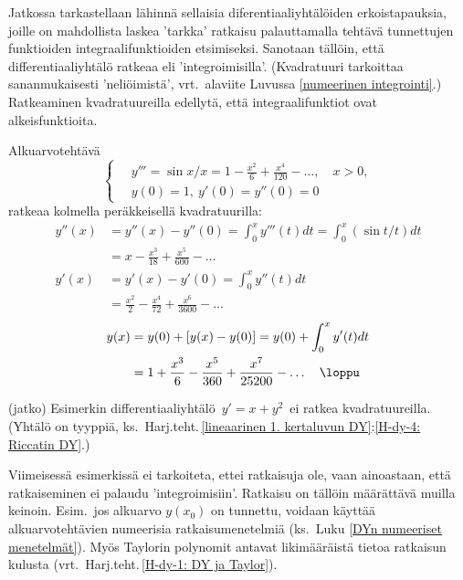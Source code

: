 Jatkossa tarkastellaan lähinnä sellaisia diferentiaaliyhtälöiden erkoistapauksia, joille on
mahdollista laskea 'tarkka' ratkaisu palauttamalla tehtävä tunnettujen funktioiden
integraalifunktioiden etsimiseksi. Sanotaan tällöin, että differentiaaliyhtälö ratkeaa 
%
 eli 'integroimisilla'. (Kvadratuuri tarkoittaa sananmukaisesti
'neliöimistä', vrt.\ alaviite Luvussa \ref{numeerinen integrointi}.) Ratkeaminen kvadratuureilla
 edellytä, että integraalifunktiot ovat alkeisfunktioita.
\begin{Exa}
Alkuarvotehtävä
\[
\left\{ \begin{aligned}
&\,y''' = \sin x/x=1-\frac{x^2}{6}+\frac{x^4}{120}-\ldots,\quad x>0, \\
&\,y(0) =1,\ y'(0)=y''(0)=0
\end{aligned} \right.
\]
ratkeaa kolmella peräkkeisellä kvadratuurilla:
\begin{align*}
y''(x) &= y''(x)-y''(0) =\int_0^x y'''(t)dt =\int_0^x (\sin t / t)dt \\
       &= x-\frac{x^3}{18}+\frac{x^5}{600}-\ldots \\[1mm]
y'(x)  &= y'(x)-y'(0)=\int_0^x y''(t)dt \\
       &= \frac{x^2}{2}-\frac{x^4}{72}+\frac{x^6}{3600}-\ldots
\end{align*}
\begin{align*}
y(x)   &= y(0)+[y(x)-y(0)] = y(0) + \int_0^x y'(t)dt \\
       &= 1+\frac{x^3}{6}-\frac{x^5}{360}+\frac{x^7}{25200}-\ldots \quad\loppu
\end{align*}
\end{Exa}
\jatko\jatko \begin{Exa} (jatko) Esimerkin differentiaaliyhtälö $\,y'=x+y^2\,$ ei ratkea
kvadratuureilla.
(Yhtälö on  tyyppiä,
ks.\ Harj.teht.\,\ref{lineaarinen 1. kertaluvun DY}:\ref{H-dy-4: Riccatin DY}.) \loppu
\end{Exa}
Viimeisessä esimerkissä ei tarkoiteta, ettei ratkaisuja ole, vaan ainoastaan, että
ratkaiseminen ei palaudu 'integroimisiin'. Ratkaisu on tällöin määrättävä muilla keinoin.
Esim.\ jos alkuarvo $y(x_0)$ on tunnettu, voidaan käyttää alkuarvotehtävien numeerisia
ratkaisumenetelmiä (ks.\ Luku \ref{DYn numeeriset menetelmät}). Myös Taylorin polynomit 
antavat likimääräistä tietoa ratkaisun kulusta (vrt.\ Harj.teht.\,\ref{H-dy-1: DY ja Taylor}).

